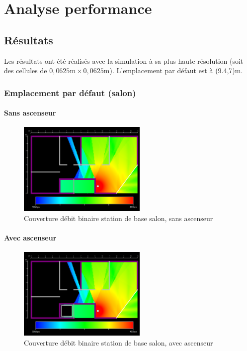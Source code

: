 \chapter{Analyse performance}
\label{chapter-4}




\section{Résultats}

Les résultats ont été réalisés avec la simulation à sa plus haute résolution (soit des cellules de $0,0625\mathrm{m}\times0,0625\mathrm{m}$). L'emplacement par défaut est à (9.4,7)m.

\subsection{Emplacement par défaut (salon)}
\subsubsection*{Sans ascenseur}

\begin{figure}[H]
    \centering
    \includegraphics[width=0.55\textwidth]{latex/images/highres-without-lift.png}
    \caption{Couverture débit binaire station de base salon, sans ascenseur}
    \label{fig:simu-emplacement-defaut-sansasc}
\end{figure}

\subsubsection*{Avec ascenseur}

\begin{figure}[H]
    \centering
    \includegraphics[width=0.55\textwidth]{latex/images/highres-with-lift.png}
    \caption{Couverture débit binaire station de base salon, avec ascenseur}
    \label{fig:simu-emplacement-defaut-avecasc}
\end{figure}

